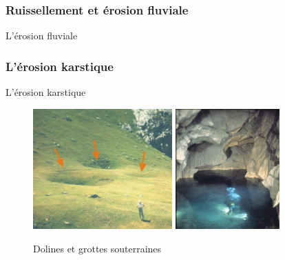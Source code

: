 \documentclass{beamer}
\begin{document}
\subsubsection{Ruissellement et érosion fluviale}
\begin{frame}{L'érosion fluviale}
 \begin{center}
  \begin{figure}
  \end{figure}
 \end{center}
\end{frame}

\subsubsection{L'érosion karstique}
\begin{frame}{L'érosion karstique}
  \begin{center}
    \begin{figure}[h]
      \includegraphics[width=5.35cm]{Images/Diapos/Erosion/Karstique/dolines.jpg}
      \includegraphics[width=4cm]{Images/Diapos/Erosion/Karstique/erosion-karstique-fig04.jpg}
      \caption{Dolines et grottes souterraines}
    \end{figure}
  \end{center}
\end{frame}
\end{document}
